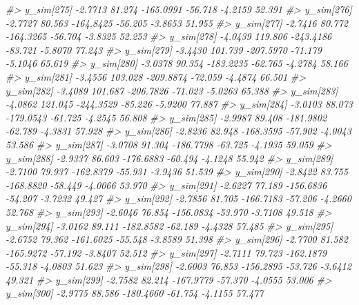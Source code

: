 \documentclass[
  10pt,
  italian,
  a4paper,
  extrafontsizes,onecolumn,openright
  ]{memoir}
\newenvironment{Shaded}{\begin{snugshade}}{\end{snugshade}}
\newcommand{\CommentTok}[1]{\textcolor[rgb]{0.56,0.35,0.01}{\textit{#1}}}
\begin{document}
\begin{Shaded}
\begin{Highlighting}[]
\CommentTok{\#\textgreater{}   y\_sim[275] {-}2.7713  81.274 {-}165.0991 {-}56.718 {-}4.2159 52.391}
\CommentTok{\#\textgreater{}   y\_sim[276] {-}2.7727  80.563 {-}164.8425 {-}56.205 {-}3.8653 51.955}
\CommentTok{\#\textgreater{}   y\_sim[277] {-}2.7416  80.772 {-}164.3265 {-}56.704 {-}3.8325 52.253}
\CommentTok{\#\textgreater{}   y\_sim[278] {-}4.0439 119.806 {-}243.4186 {-}83.721 {-}5.8070 77.243}
\CommentTok{\#\textgreater{}   y\_sim[279] {-}3.4430 101.739 {-}207.5970 {-}71.179 {-}5.1046 65.619}
\CommentTok{\#\textgreater{}   y\_sim[280] {-}3.0378  90.354 {-}183.2235 {-}62.765 {-}4.2784 58.166}
\CommentTok{\#\textgreater{}   y\_sim[281] {-}3.4556 103.028 {-}209.8874 {-}72.059 {-}4.4874 66.501}
\CommentTok{\#\textgreater{}   y\_sim[282] {-}3.4089 101.687 {-}206.7826 {-}71.023 {-}5.0263 65.388}
\CommentTok{\#\textgreater{}   y\_sim[283] {-}4.0862 121.045 {-}244.3529 {-}85.226 {-}5.9200 77.887}
\CommentTok{\#\textgreater{}   y\_sim[284] {-}3.0103  88.073 {-}179.0543 {-}61.725 {-}4.2545 56.808}
\CommentTok{\#\textgreater{}   y\_sim[285] {-}2.9987  89.408 {-}181.9802 {-}62.789 {-}4.3831 57.928}
\CommentTok{\#\textgreater{}   y\_sim[286] {-}2.8236  82.948 {-}168.3595 {-}57.902 {-}4.0043 53.586}
\CommentTok{\#\textgreater{}   y\_sim[287] {-}3.0708  91.304 {-}186.7798 {-}63.725 {-}4.1935 59.059}
\CommentTok{\#\textgreater{}   y\_sim[288] {-}2.9337  86.603 {-}176.6883 {-}60.494 {-}4.1248 55.942}
\CommentTok{\#\textgreater{}   y\_sim[289] {-}2.7100  79.937 {-}162.8379 {-}55.931 {-}3.9436 51.539}
\CommentTok{\#\textgreater{}   y\_sim[290] {-}2.8422  83.755 {-}168.8820 {-}58.449 {-}4.0066 53.970}
\CommentTok{\#\textgreater{}   y\_sim[291] {-}2.6227  77.189 {-}156.6836 {-}54.207 {-}3.7232 49.427}
\CommentTok{\#\textgreater{}   y\_sim[292] {-}2.7856  81.705 {-}166.7183 {-}57.206 {-}4.2660 52.768}
\CommentTok{\#\textgreater{}   y\_sim[293] {-}2.6046  76.854 {-}156.0834 {-}53.970 {-}3.7108 49.518}
\CommentTok{\#\textgreater{}   y\_sim[294] {-}3.0162  89.111 {-}182.8582 {-}62.189 {-}4.4328 57.485}
\CommentTok{\#\textgreater{}   y\_sim[295] {-}2.6752  79.362 {-}161.6025 {-}55.548 {-}3.8589 51.398}
\CommentTok{\#\textgreater{}   y\_sim[296] {-}2.7700  81.582 {-}165.9272 {-}57.192 {-}3.8407 52.512}
\CommentTok{\#\textgreater{}   y\_sim[297] {-}2.7111  79.723 {-}162.1879 {-}55.318 {-}4.0803 51.623}
\CommentTok{\#\textgreater{}   y\_sim[298] {-}2.6003  76.853 {-}156.2895 {-}53.726 {-}3.6412 49.321}
\CommentTok{\#\textgreater{}   y\_sim[299] {-}2.7582  82.214 {-}167.9779 {-}57.370 {-}4.0555 53.006}
\CommentTok{\#\textgreater{}   y\_sim[300] {-}2.9775  88.586 {-}180.4660 {-}61.754 {-}4.1155 57.477}

\end{Highlighting}
\end{Shaded}
\end{document}
